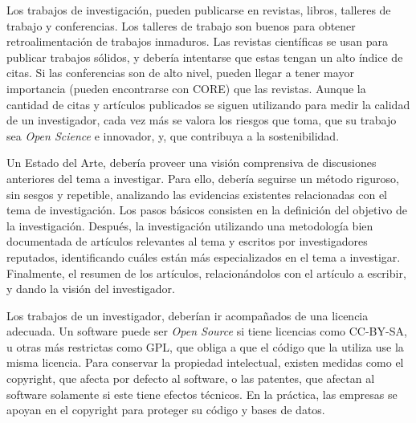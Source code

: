\documentclass{article}
\begin{document}
Los trabajos de investigación, pueden publicarse en revistas, libros, talleres de trabajo y conferencias. Los talleres de trabajo son buenos para obtener retroalimentación de trabajos inmaduros. Las revistas científicas se usan para publicar trabajos sólidos, y debería intentarse que estas tengan un alto índice de citas. Si las conferencias son de alto nivel, pueden llegar a tener mayor importancia (pueden encontrarse con CORE) que las revistas. Aunque la cantidad de citas y artículos publicados se siguen utilizando para medir la calidad de un investigador, cada vez más se valora los riesgos que toma, que su trabajo sea \emph{Open Science} e innovador, y, que contribuya a la sostenibilidad.

Un Estado del Arte, debería proveer una visión comprensiva de discusiones anteriores del tema a investigar. Para ello, debería seguirse un método riguroso, sin sesgos y repetible, analizando las evidencias existentes relacionadas con el tema de investigación. Los pasos básicos consisten en la definición del objetivo de la investigación. Después, la investigación utilizando una metodología bien documentada de artículos relevantes al tema y escritos por investigadores reputados, identificando cuáles están más especializados en el tema a investigar. Finalmente, el resumen de los artículos, relacionándolos con el artículo a escribir, y dando la visión del investigador.

Los trabajos de un investigador, deberían ir acompañados de una licencia adecuada. Un software puede ser \emph{Open Source} si tiene licencias como CC-BY-SA, u otras más restrictas como GPL, que obliga a que el código que la utiliza use la misma licencia. Para conservar la propiedad intelectual, existen medidas como el copyright, que afecta por defecto al software, o las patentes, que afectan al software solamente si este tiene efectos técnicos. En la práctica, las empresas se apoyan en el copyright para proteger su código y bases de datos.   
\end{document}
